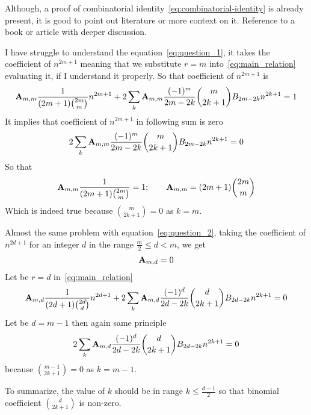 \begin{question}
    Although, a proof of combinatorial identity~\eqref{eq:combinatorial-identity} is already present, it is good
    to point out literature or more context on it.
    Reference to a book or article with deeper discussion.
\end{question}
\begin{question}
    I have struggle to understand the equation~\eqref{eq:question_1}, it takes the coefficient of $n^{2m+1}$ meaning that
    we substitute $r=m$ into~\eqref{eq:main_relation} evaluating it, if I understand it properly.
    So that coefficient of $n^{2m+1}$ is
    \begin{align*}
         {\mathbf{A}} \sb{m,m} \frac{1}{(2m+1) \binom{2m}m} n^{2m+1}
        + 2 \sum_{k} {\mathbf{A}} \sb{m,m} \frac{(-1)^m}{2m-2k} \binom{m}{2k+1} {B}\sb{2m-2k} n^{2k+1} = 1
    \end{align*}
    It implies that coefficient of $n^{2m+1}$ in following sum is zero
    \begin{align*}
        2 \sum_{k} {\mathbf{A}} \sb{m,m} \frac{(-1)^m}{2m-2k} \binom{m}{2k+1} {B}\sb{2m-2k} n^{2k+1} = 0
    \end{align*}
    So that
    \begin{align*}
        {\mathbf{A}} \sb{m,m} \frac{1}{(2m+1) \binom{2m}m} = 1; \quad \quad {\mathbf{A}} \sb{m,m} = (2m+1)\binom{2m}{m}
    \end{align*}
    Which is indeed true because $\binom{m}{2k+1} = 0$ as $k=m$.
\end{question}
\begin{question}
    Almost the same problem with equation~\eqref{eq:question_2},
    taking the coefficient of $n^{2d+1}$ for an integer $d$ in the range $\frac{m}{2} \leq d < m$, we get
    \begin{align*}
        {\mathbf{A}} \sb{m,d} = 0
    \end{align*}
    Let be $r=d$ in~\eqref{eq:main_relation}
    \begin{align*}
        {\mathbf{A}} \sb{m,d} \frac{1}{(2d+1) \binom{2d}d} n^{2d+1}
        + 2 \sum_{k} {\mathbf{A}} \sb{m,d} \frac{(-1)^d}{2d-2k} \binom{d}{2k+1} {B}\sb{2d-2k} n^{2k+1} = 0
    \end{align*}
    Let be $d=m-1$ then again same principle
    \begin{align*}
        2 \sum_{k} {\mathbf{A}} \sb{m,d} \frac{(-1)^d}{2d-2k} \binom{d}{2k+1} {B}\sb{2d-2k} n^{2k+1} = 0
    \end{align*}
    because $\binom{m-1}{2k+1}=0$ as $k=m-1$.
\end{question}
To summarize, the value of $k$ should be in range $k \leq \frac{d-1}{2}$ so that binomial coefficient $\binom{d}{2k+1}$
is non-zero.
